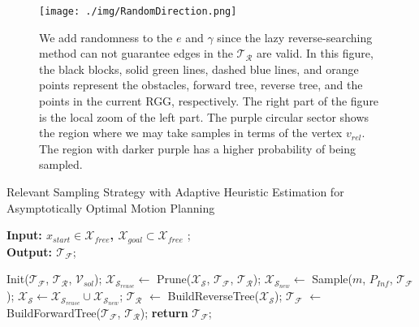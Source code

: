 \begin{figure}[t]
    \centering
    \texttt{[image: ./img/RandomDirection.png]}
    \caption{We add randomness to the $e$ and $\gamma$ since the lazy reverse-searching method can not guarantee edges in the $\mathcal{T}_{\mathcal{R}}$ are valid. 
    In this figure, the black blocks, solid green lines, dashed blue lines, and orange points represent the obstacles, forward tree, reverse tree, and the points in the current RGG, respectively.
    The right part of the figure is the local zoom of the left part.
    The purple circular sector shows the region where we may take samples in terms of the vertex $v_{rel}$.
    The region with darker purple has a higher probability of being sampled.}
    \label{RandomDirection}
\end{figure}

\begin{algorithm}[t]
    \caption{Relevant Sampling Strategy with Adaptive Heuristic Estimation for Asymptotically Optimal Motion Planning}
    \label{MainFunction}
        \hspace*{\algorithmicindent} \textbf{Input: $x_{start} \in \mathcal{X}_{free}$, $\mathcal{X}_{goal} \subset \mathcal{X}_{free}$ }; \\
        \hspace*{\algorithmicindent} \textbf{Output: $\mathcal{T}_{\mathcal{F}}$};
        \begin{algorithmic}[1]
        \State Init($\mathcal{T}_{\mathcal{F}}$, $\mathcal{T}_{\mathcal{R}}$, $\mathcal{V}_{sol}$);
            \State $\mathcal{X}_{\mathcal{S}_{reuse}} \gets$ Prune($\mathcal{X}_{\mathcal{S}}$, $\mathcal{T}_{\mathcal{F}}$, $\mathcal{T}_{\mathcal{R}}$);   \label{pruneFunction}
            \State $\mathcal{X}_{\mathcal{S}_{new}} \gets$ Sample($m$, $P_{Inf}$, $\mathcal{T}_{\mathcal{F}}$);  \label{SampleLine}
            \State $\mathcal{X}_{\mathcal{S}} \gets \mathcal{X}_{\mathcal{S}_{reuse}} \cup \mathcal{X}_{\mathcal{S}_{new}}$;
            \State $\mathcal{T}_{\mathcal{R}}$ $\gets$ BuildReverseTree($\mathcal{X}_{\mathcal{S}}$);
            \State $\mathcal{T}_{\mathcal{F}}$ $\gets$ BuildForwardTree($\mathcal{T}_{\mathcal{F}}$, $\mathcal{T}_{\mathcal{R}}$); \label{BuildForwardTreeLine}
        \EndWhile
        \State \textbf{return} $\mathcal{T}_{\mathcal{F}}$;
    \end{algorithmic}
\end{algorithm}








